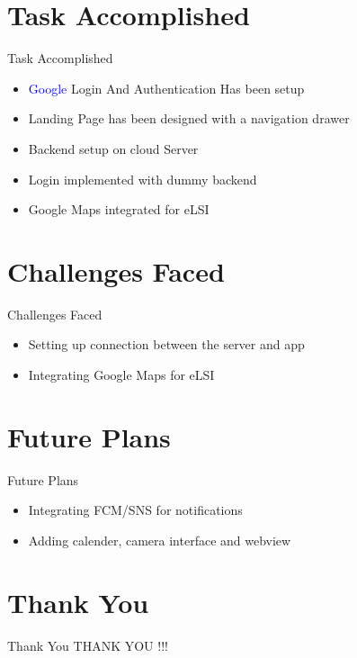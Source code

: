\documentclass[10pt, a4paper]{beamer}
\begin{document}
\section{Task Accomplished}
\begin{frame}{Task Accomplished}
	\begin{itemize}
		\item \textcolor{blue}{Google} Login And Authentication Has been setup
		 \item Landing Page has been designed with a navigation drawer
		\item Backend setup on cloud Server
		\item Login implemented with dummy backend
		\item Google Maps integrated for eLSI 
		
	\end{itemize}
\end{frame}

\section{Challenges Faced}
\begin{frame}{Challenges Faced}
	\begin{itemize}
		\item Setting up connection between the server and app 
		\item Integrating Google Maps for eLSI
	\end{itemize}
\end{frame}

\section{Future Plans}
\begin{frame}{Future Plans}
	\begin{itemize}
		\item  Integrating FCM/SNS for notifications
		\item Adding calender, camera interface and webview
	\end{itemize}
\end{frame}


\section{Thank You}
\begin{frame}{Thank You}
	\centering THANK YOU !!!
\end{frame}
\end{document}

